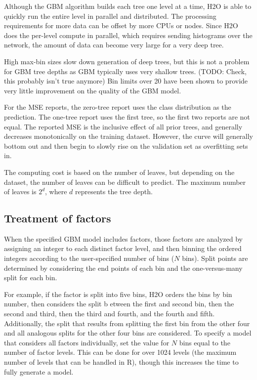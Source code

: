 Although the GBM algorithm builds each tree one level at a time, H2O is able to quickly run the entire level in
parallel and distributed. The processing requirements for more data can be offset by more CPUs or nodes.
Since H2O does the per-level compute in parallel, which requires sending histograms over the network, the amount
of data can become very large for a very deep tree.

High max-bin sizes slow down generation of deep trees, but this is not a problem for GBM tree depths as GBM
typically uses very shallow trees. (TODO: Check, this probably isn't true anymore)  Bin limits over 20 have been shown to provide very little improvement on
the quality of the GBM model.

For the MSE reports, the zero-tree report uses the class distribution as the prediction. The one-tree report
uses the first tree, so the first two reports are not equal. The reported MSE is the inclusive effect of all
prior trees, and generally decreases monotonically on the training dataset. However, the curve will generally
bottom out and then begin to slowly rise on the validation set as overfitting sets in.

The computing cost is based on the number of leaves, but depending on the dataset, the number of leaves can be
difficult to predict. The maximum number of leaves is $2^d$, where $d$ represents the tree depth.

\subsection{Treatment of factors}

When the specified GBM model includes factors, those factors are analyzed by assigning an integer to each distinct
factor level, and then binning the ordered integers according to the user-specified number of bins ($N$ bins). Split
points are determined by considering the end points of each bin and the one-versus-many split for each bin.

For example, if the factor is split into five bins, H2O orders the bins by bin number, then considers the split b
etween the first and second bin, then the second and third, then the third and fourth, and the fourth and fifth.
Additionally, the split that results from splitting the first bin from the other four and all analogous splits for
the other four bins are considered. To specify a model that considers all factors individually, set the value for
$N$ bins equal to the number of factor levels. This can be done for over 1024 levels (the maximum number of levels
that can be handled in R), though this increases the time to fully generate a model.


